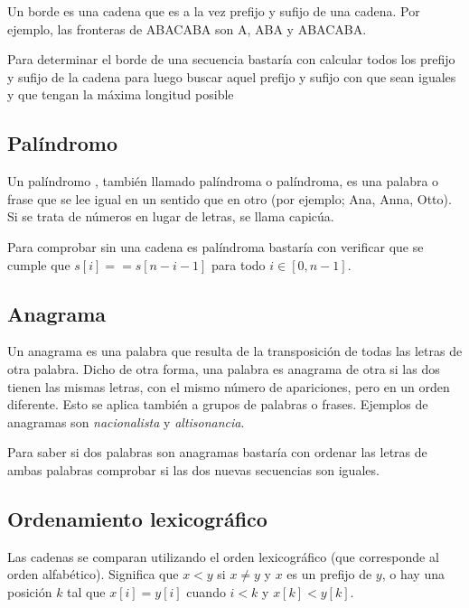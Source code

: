 Un borde es una cadena que es a la vez prefijo y sufijo de una cadena. Por ejemplo, las fronteras de ABACABA son A, ABA y ABACABA.

Para determinar el borde de una secuencia bastaría con calcular todos los prefijo y sufijo de la cadena para luego buscar aquel prefijo  y sufijo con que sean iguales  y que tengan la máxima longitud posible  

\subsection{Palíndromo}
Un palíndromo , también llamado palíndroma o palíndroma, es una palabra o frase que se lee igual en un sentido que en otro (por ejemplo; Ana, Anna, Otto). Si se trata de números en lugar de letras, se llama capicúa. 

Para comprobar sin una cadena es palíndroma bastaría con verificar que se cumple que $s[i] == s[n-i-1]$ para todo $ i \in [0,n-1]$.

\subsection{Anagrama}
Un anagrama es una palabra que resulta de la transposición de todas las letras de otra palabra. Dicho de otra forma, una palabra es anagrama de otra si las dos tienen las mismas letras, con el mismo número de apariciones, pero en un orden diferente. Esto se aplica también a grupos de palabras o frases. Ejemplos de anagramas son \emph{nacionalista} y \emph{altisonancia}. 

Para saber si  dos palabras son anagramas bastaría con ordenar las letras de ambas palabras comprobar si las dos nuevas secuencias son iguales. 

\subsection{Ordenamiento lexicográfico}

Las cadenas se comparan utilizando el orden lexicográfico (que corresponde al orden alfabético). Significa que $x < y$ si $x \neq y$ y $x$ es un prefijo de $y$, o hay una posición $k$ tal que $x[ i ] = y[ i ]$ cuando $i < k$ y $x[k]<y[k]$.